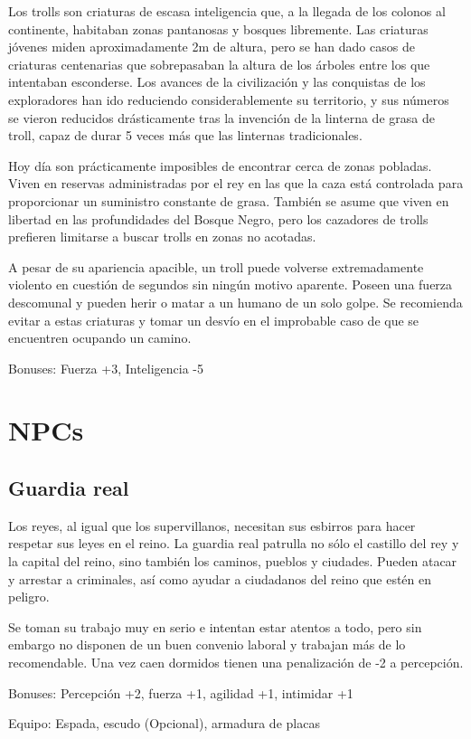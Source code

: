 Los trolls son criaturas de escasa inteligencia que, a la llegada de los colonos al continente, habitaban zonas pantanosas y bosques libremente. Las criaturas jóvenes miden aproximadamente 2m de altura, pero se han dado casos de criaturas centenarias que sobrepasaban la altura de los árboles entre los que intentaban esconderse. Los avances de la civilización y las conquistas de los exploradores han ido reduciendo considerablemente su territorio, y sus números se vieron reducidos drásticamente tras la invención de la linterna de grasa de troll, capaz de durar 5 veces más que las linternas tradicionales. 
\par 
Hoy día son prácticamente imposibles de encontrar cerca de zonas pobladas. Viven en reservas administradas por el rey en las que la caza está controlada para proporcionar un suministro constante de grasa. También se asume que viven en libertad en las profundidades del Bosque Negro, pero los cazadores de trolls prefieren limitarse a buscar trolls en zonas no acotadas.
\par 
A pesar de su apariencia apacible, un troll puede volverse extremadamente violento en cuestión de segundos sin ningún motivo aparente. Poseen una fuerza descomunal y pueden herir o matar a un humano de un solo golpe. Se recomienda evitar a estas criaturas y tomar un desvío en el improbable caso de que se encuentren ocupando un camino.
\par 
Bonuses: Fuerza +3, Inteligencia -5

\section{NPCs}

\subsection*{Guardia real}

Los reyes, al igual que los supervillanos, necesitan sus esbirros para hacer respetar sus leyes en el reino. La guardia real patrulla no sólo el castillo del rey y la capital del reino, sino también los caminos, pueblos y ciudades. Pueden atacar y arrestar a criminales, así como ayudar a ciudadanos del reino que estén en peligro. 
\par
Se toman su trabajo muy en serio e intentan estar atentos a todo, pero sin embargo no disponen de un buen convenio laboral y trabajan más de lo recomendable. Una vez caen dormidos tienen una penalización de -2 a percepción. 
\par 
Bonuses: Percepción +2, fuerza +1, agilidad +1, intimidar +1
\par 
Equipo: Espada, escudo (Opcional), armadura de placas

